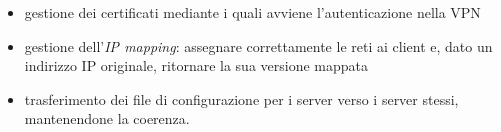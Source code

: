 \documentclass[10pt,a4paper]{article}
\begin{document}
\begin{enumerate}
\begin{itemize}
                \item gestione dei certificati mediante i quali avviene l'autenticazione
                nella VPN
                \item gestione dell'\textit{IP mapping}: assegnare correttamente le reti
                ai client e, dato un indirizzo IP originale, ritornare la sua versione mappata
                \item trasferimento dei file di configurazione per i server verso i server stessi,
                mantenendone la coerenza.
            \end{itemize}
        \end{enumerate}

        
\end{document}
